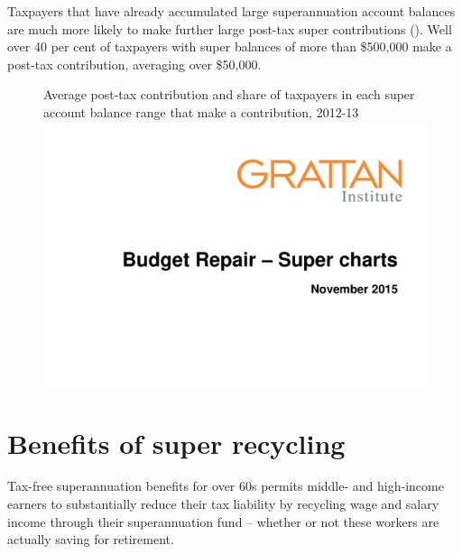 \begin{subappendices}
\begin{figure}

\end{figure}
Taxpayers that have already accumulated large superannuation account balances are much more likely to make further large post-tax super contributions (). Well over 40 per cent of taxpayers with super balances of more than \$500,000 make a post-tax contribution, averaging over \$50,000.

\begin{figure}
%
{Average post-tax contribution and share of taxpayers in each super account balance range that make a contribution, 2012-13}%
\includegraphics[width=\columnwidth,page=47]{super-atlas/PPTX.pdf}

\end{figure}


\chapter{Benefits of super recycling}\label{appendix:SUPER-B}
Tax-free superannuation benefits for over 60s permits middle- and high-income earners to substantially reduce their tax liability by recycling wage and salary income through their superannuation fund -- whether or not these workers are actually saving for retirement.


\end{subappendices}
